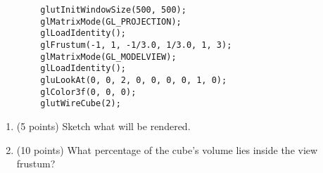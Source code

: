 \documentclass[13pt]{letter}
\begin{document}
\begin{enumerate}
	\begin{verbatim}
		glutInitWindowSize(500, 500);
		glMatrixMode(GL_PROJECTION);
		glLoadIdentity();
		glFrustum(-1, 1, -1/3.0, 1/3.0, 1, 3);
		glMatrixMode(GL_MODELVIEW);
		glLoadIdentity();
		gluLookAt(0, 0, 2, 0, 0, 0, 0, 1, 0);
		glColor3f(0, 0, 0);
		glutWireCube(2);
	\end{verbatim}
	\begin{enumerate}
		\item (5 points)
		Sketch what will be rendered.

		\item (10 points) 
		What percentage of the cube’s volume lies inside the view frustum?
	
	\end{enumerate}
\end{enumerate}
\end{document}
